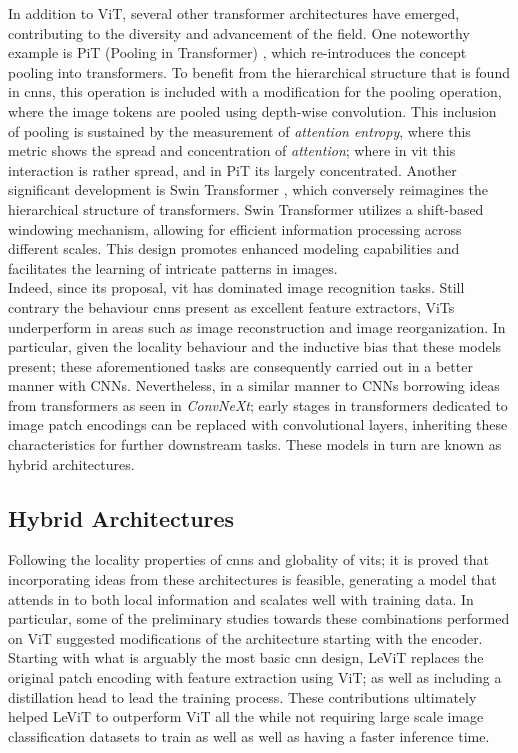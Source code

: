 In addition to ViT, several other transformer architectures have emerged, contributing to the 
diversity and advancement of the field. One noteworthy example is PiT (Pooling in Transformer) 
\autocite{heo2021rethinking}, which re-introduces the concept pooling into transformers. To benefit 
from the hierarchical structure that is found in \glspl{cnn}, this operation is included with 
a modification for the pooling operation, where the image tokens are  pooled using depth-wise 
convolution. This inclusion of pooling is sustained by the measurement of \emph{attention entropy}, 
where this metric shows the spread and concentration of \emph{attention}; where in \gls{vit} this 
interaction is rather spread, and in PiT its largely concentrated. Another significant 
development is Swin Transformer \autocite{liu2021swin}, which conversely reimagines the 
hierarchical structure of transformers. 
Swin Transformer utilizes a shift-based windowing mechanism, allowing for efficient information 
processing across different scales. This design promotes enhanced modeling capabilities and 
facilitates the learning of intricate patterns in images.\\

\noindent Indeed, since its proposal, \gls{vit} has dominated image recognition tasks. Still 
contrary the behaviour \glspl{cnn} present as excellent feature extractors, ViTs underperform in 
areas such as image reconstruction and image reorganization. In particular, given the locality 
behaviour and the inductive bias that these models present; these aforementioned tasks are 
consequently carried out in a better manner with CNNs. Nevertheless, in a similar manner to 
CNNs borrowing ideas from transformers as seen in \emph{ConvNeXt}; early stages in transformers 
dedicated to image patch encodings can be replaced with convolutional layers, inheriting these 
characteristics for further downstream tasks. These models in turn are known as hybrid 
architectures.


\subsection{Hybrid Architectures}
\label{rel:sub_hybrid}
Following the locality properties of \glspl{cnn} and globality of \glspl{vit}; it is proved 
that incorporating ideas from these architectures is feasible, generating a model that attends in 
to both local information and scalates well with training data. In particular, some of the 
preliminary studies towards these combinations performed on ViT suggested modifications of the 
architecture starting with the encoder. Starting with what is arguably the most basic \gls{cnn} 
design, LeViT \autocite{graham2021levit} replaces the original patch encoding with feature 
extraction using ViT; as well as including a distillation head to lead the training process. 
These contributions ultimately helped LeViT to outperform ViT all the while not requiring large 
scale image classification datasets to train as well as well as having a faster inference time.

